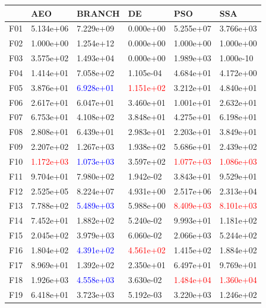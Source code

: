 \documentclass{article}
\begin{document}
\begin{table}[H]
	\centering
	\begin{tabular}{|l|lllll|}
		\hline
		{} &        AEO &     BRANCH &         DE &        PSO &        SSA \\
		\hline
		F01  &  5.134e+06 &  7.229e+09 &  0.000e+00 &  5.255e+07 &  3.766e+03 \\
		F02  &  1.000e+00 &  1.254e+12 &  0.000e+00 &  1.000e+00 &  1.000e+00 \\
		F03  &  3.575e+02 &  1.493e+04 &  0.000e+00 &  1.989e+03 &  1.000e-10 \\
		F04  &  1.414e+01 &  7.058e+02 &  1.105e-04 &  4.684e+01 &  4.172e+00 \\
		F05  &  3.876e+01 &  \textcolor{blue}{6.928e+01} &  \textcolor{red}{1.151e+02} &  3.212e+01 &  4.840e+01 \\
		F06  &  2.617e+01 &  6.047e+01 &  3.460e+01 &  1.001e+01 &  2.632e+01 \\
		F07  &  6.753e+01 &  4.108e+02 &  3.848e+01 &  4.275e+01 &  6.198e+01 \\
		F08  &  2.808e+01 &  6.439e+01 &  2.983e+01 &  2.203e+01 &  3.849e+01 \\
		F09  &  2.207e+02 &  1.267e+03 &  1.938e+02 &  5.686e+01 &  2.439e+02 \\
		F10  &  \textcolor{red}{1.172e+03} &  \textcolor{blue}{1.073e+03} &  3.597e+02 &  \textcolor{red}{1.077e+03} &  \textcolor{red}{1.086e+03} \\
		F11  &  9.704e+01 &  7.980e+02 &  1.942e-02 &  3.843e+01 &  9.529e+01 \\
		F12  &  2.525e+05 &  8.224e+07 &  4.931e+00 &  2.517e+06 &  2.313e+04 \\
		F13  &  7.788e+02 &  \textcolor{blue}{5.489e+03} &  5.988e+00 &  \textcolor{red}{8.409e+03} &  \textcolor{red}{8.101e+03} \\
		F14  &  7.452e+01 &  1.882e+02 &  5.240e-02 &  9.993e+01 &  1.181e+02 \\
		F15  &  2.045e+02 &  3.979e+03 &  6.060e-02 &  2.066e+03 &  5.244e+02 \\
		F16  &  1.804e+02 &  \textcolor{blue}{4.391e+02} &  \textcolor{red}{4.561e+02} &  1.415e+02 &  1.884e+02 \\
		F17  &  8.969e+01 &  1.392e+02 &  2.350e+01 &  6.497e+01 &  9.769e+01 \\
		F18  &  1.926e+03 &  \textcolor{blue}{4.558e+03} &  3.630e-02 &  \textcolor{red}{1.484e+04} &  \textcolor{red}{1.360e+04} \\
		F19  &  6.418e+01 &  3.723e+03 &  5.192e-03 &  3.220e+03 &  1.246e+02 \\

\end{tabular}
\end{table}
\end{document}
